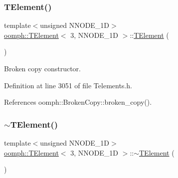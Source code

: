 \subsubsection{\texorpdfstring{T\+Element()}{TElement()}\hspace{0.1cm}{\footnotesize\ttfamily [2/2]}}
{\footnotesize\ttfamily template$<$unsigned N\+N\+O\+D\+E\+\_\+1D$>$ \\
\hyperlink{classoomph_1_1TElement}{oomph\+::\+T\+Element}$<$ 3, N\+N\+O\+D\+E\+\_\+1D $>$\+::\hyperlink{classoomph_1_1TElement}{T\+Element} (\begin{DoxyParamCaption}\item[{const \hyperlink{classoomph_1_1TElement}{T\+Element}$<$ 3, N\+N\+O\+D\+E\+\_\+1D $>$ \&}]{ }\end{DoxyParamCaption})\hspace{0.3cm}{\ttfamily [inline]}}



Broken copy constructor. 



Definition at line 3051 of file Telements.\+h.



References oomph\+::\+Broken\+Copy\+::broken\+\_\+copy().

\mbox{\label{classoomph_1_1TElement_3_013_00_01NNODE__1D_01_4_a5f93e6aeeedcca1a15d1b3972525ffda}} 
\subsubsection{\texorpdfstring{$\sim$\+T\+Element()}{~TElement()}}
{\footnotesize\ttfamily template$<$unsigned N\+N\+O\+D\+E\+\_\+1D$>$ \\
\hyperlink{classoomph_1_1TElement}{oomph\+::\+T\+Element}$<$ 3, N\+N\+O\+D\+E\+\_\+1D $>$\+::$\sim$\hyperlink{classoomph_1_1TElement}{T\+Element} (\begin{DoxyParamCaption}{ }\end{DoxyParamCaption})\hspace{0.3cm}{\ttfamily [inline]}}



